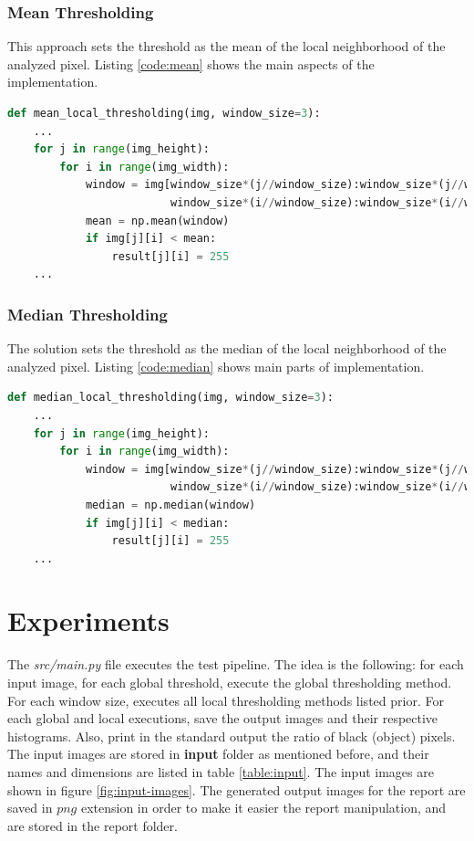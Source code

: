 \documentclass[]{IEEEtran}
\begin{document}
\subsubsection{Mean Thresholding}
This approach sets the threshold as the mean of the local neighborhood of the analyzed pixel. Listing \ref{code:mean} shows the main aspects of the implementation.

\begin{lstlisting}[language=Python, caption={Mean Thresholding Implementation}, label={code:mean}]
  def mean_local_thresholding(img, window_size=3):
    ...
    for j in range(img_height):
        for i in range(img_width):
            window = img[window_size*(j//window_size):window_size*(j//window_size) + window_size,
                         window_size*(i//window_size):window_size*(i//window_size) + window_size]
            mean = np.mean(window)
            if img[j][i] < mean:
                result[j][i] = 255
    ...
\end{lstlisting}

\subsubsection{Median Thresholding}
The solution sets the threshold as the median of the local neighborhood of the analyzed pixel. Listing \ref{code:median} shows main parts of implementation.

\begin{lstlisting}[language=Python, caption={Median Thresholding Implementation}, label={code:median}]
  def median_local_thresholding(img, window_size=3):
    ...
    for j in range(img_height):
        for i in range(img_width):
            window = img[window_size*(j//window_size):window_size*(j//window_size) + window_size,
                         window_size*(i//window_size):window_size*(i//window_size) + window_size]
            median = np.median(window)
            if img[j][i] < median:
                result[j][i] = 255
    ...
\end{lstlisting}

\section{Experiments}
The \textit{src/main.py} file executes the test pipeline. The idea is the following: for each input image, for each global threshold, execute the global thresholding method. For each window size, executes all local thresholding methods listed prior. For each global and local executions, save the output images and their respective histograms. Also, print in the standard output the ratio of black (object) pixels. The input images are stored in \textbf{input} folder as mentioned before, and their names and dimensions are listed in table \ref{table:input}. The input images are shown in figure \ref{fig:input-images}. The generated output images for the report are saved in $png$ extension in order to make it easier the report manipulation, and are stored in the report folder.
\end{document}
